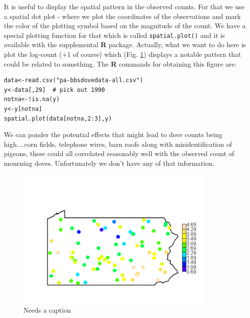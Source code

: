 It is useful to display the spatial pattern in the observed counts. For that we use a
spatial dot plot - where we plot the coordinates of the observations
and mark the color of the plotting symbol based on the magnitude of
the count.  We have a special plotting function for that which is
called \mbox{\tt spatial.plot()} and it is available with the
supplemental {\bf R} package.
Actually, what we want to do here is plot the
log-count (+1 of course) which (Fig. \ref{glms.fig.padovecounts}) displays a notable pattern that could
be related to something. The {\bf R} commands for obtaining this figure are:
{\small
\begin{verbatim}
data<-read.csv("pa-bbsdovedata-all.csv")
y<-data[,29]  # pick out 1990
notna<-!is.na(y)
y<-y[notna]
spatial.plot(data[notna,2:3],y)
\end{verbatim}
}
 We can ponder the potential effects that
might lead to dove counts being high....corn fields, telephone wires,
barn roofs along with misidentification of pigeons, these could all
correlated reasonably well with the observed count of mourning doves.
Unfortunately we don't have any of that information.

\begin{figure}
\begin{center}
\includegraphics[height=2.75in]{Ch2/figs/PA1}
\end{center}
\caption{Needs a caption}
\label{glms.fig.padovecounts}
\end{figure}

